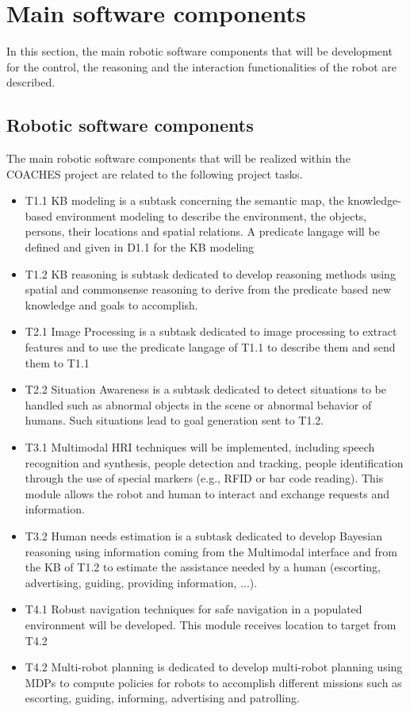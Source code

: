 \documentclass{article}
\begin{document}
\section{Main software components}

In this section, the main robotic software components that will be development for the control, the reasoning and the interaction functionalities of the robot are described.

\subsection{Robotic software components}

The main robotic software components that will be realized within the COACHES project are related to the following project tasks.
\begin{itemize}
\item T1.1 KB modeling is a subtask concerning the semantic map, the knowledge-based  environment modeling to describe the environment, the objects, persons, their locations and spatial relations. A predicate langage will be defined and given in D1.1 for the KB modeling
\item T1.2 KB reasoning is subtask dedicated to develop reasoning methods using spatial and commonsense reasoning to derive from the predicate based new knowledge and goals to accomplish.
\item T2.1 Image Processing is  a subtask dedicated to image processing to extract features and to use the predicate langage of T1.1 to describe them and send them to T1.1
\item T2.2 Situation Awareness is a subtask dedicated to detect situations to be handled such as abnormal objects in the scene or abnormal behavior of humans. Such situations lead to goal generation sent to T1.2.
\item T3.1 Multimodal HRI techniques  will be implemented, including speech recognition and synthesis, people detection and tracking, people identification through the use of special markers (e.g., RFID or bar code reading). This module allows the robot and human to interact and exchange requests and information. 
\item T3.2 Human needs estimation is a subtask dedicated to develop Bayesian reasoning using information coming from the Multimodal interface and from the KB of T1.2 to estimate the assistance needed by a human (escorting, advertising, guiding, providing information, ...). 
\item T4.1 Robust navigation techniques for safe navigation in a populated environment will be developed. This module receives location to target from T4.2
\item T4.2 Multi-robot planning is dedicated to develop multi-robot planning using MDPs to compute policies for robots to accomplish different missions such as escorting, guiding, informing, advertising and patrolling. 
\end{itemize}
\end{document}

